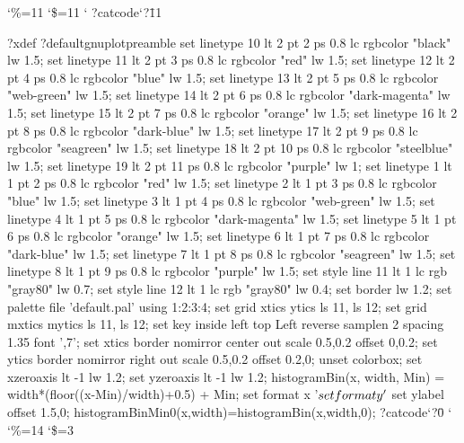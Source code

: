 

\def\pdfshellescape{1}
\usepackage[miktex,shell]{gnuplottex2}
\catcode`\%=11
\catcode`\$=11
\catcode`
?catcode`?\=11


?xdef ?defaultgnuplotpreamble {set linetype 10 lt 2 pt 2 ps 0.8 lc rgbcolor "black" lw 1.5;
set linetype 11 lt 2 pt 3 ps 0.8 lc rgbcolor "red" lw 1.5;
set linetype 12 lt 2 pt 4 ps 0.8 lc rgbcolor "blue" lw 1.5;
set linetype 13 lt 2 pt 5 ps 0.8 lc rgbcolor "web-green" lw 1.5;
set linetype 14 lt 2 pt 6 ps 0.8 lc rgbcolor "dark-magenta" lw 1.5;
set linetype 15 lt 2 pt 7 ps 0.8 lc rgbcolor "orange" lw 1.5;
set linetype 16 lt 2 pt 8 ps 0.8 lc rgbcolor "dark-blue" lw 1.5;
set linetype 17 lt 2 pt 9 ps 0.8 lc rgbcolor "seagreen" lw 1.5;
set linetype 18 lt 2 pt 10 ps 0.8 lc rgbcolor "steelblue" lw 1.5;
set linetype 19 lt 2 pt 11 ps 0.8 lc rgbcolor "purple" lw 1;
set linetype 1 lt 1 pt 2 ps 0.8 lc rgbcolor "red" lw 1.5;
set linetype 2 lt 1 pt 3 ps 0.8 lc rgbcolor "blue" lw 1.5;
set linetype 3 lt 1 pt 4 ps 0.8 lc rgbcolor "web-green" lw 1.5;
set linetype 4 lt 1 pt 5 ps 0.8 lc rgbcolor "dark-magenta" lw 1.5;
set linetype 5 lt 1 pt 6 ps 0.8 lc rgbcolor "orange" lw 1.5;
set linetype 6 lt 1 pt 7 ps 0.8 lc rgbcolor "dark-blue" lw 1.5;
set linetype 7 lt 1 pt 8 ps 0.8 lc rgbcolor "seagreen" lw 1.5;
set linetype 8 lt 1 pt 9 ps 0.8 lc rgbcolor "purple" lw 1.5;
set style line 11 lt 1 lc rgb "gray80" lw 0.7;
set style line 12 lt 1 lc rgb "gray80" lw 0.4;
set border lw 1.2;
set palette file 'default.pal' using 1:2:3:4;
set grid xtics ytics ls 11, ls 12;
set grid mxtics mytics ls 11, ls 12;
set key inside left top Left reverse samplen 2 spacing 1.35 font ',7';
set xtics border nomirror center out scale 0.5,0.2 offset 0,0.2;
set ytics border nomirror right out scale 0.5,0.2 offset 0.2,0;
unset colorbox;
set xzeroaxis lt -1 lw 1.2;
set yzeroaxis lt -1 lw 1.2;
histogramBin(x, width, Min) = width*(floor((x-Min)/width)+0.5) + Min;
set format x '\fsfn $%
set format y '\fsfn $%
set ylabel offset 1.5,0;
histogramBinMin0(x,width)=histogramBin(x,width,0);
}
?catcode`?\=0
\catcode`
\catcode`\%=14
\catcode`\$=3
%
%

%

\newcommand{\defaultgnuplotterminal}{cairolatex}
\newcommand{\defaultgnuplotterminalopts}[2]{pdf color dashed transparent linewidth 2 fontscale 0.5 size #1,#2 }
